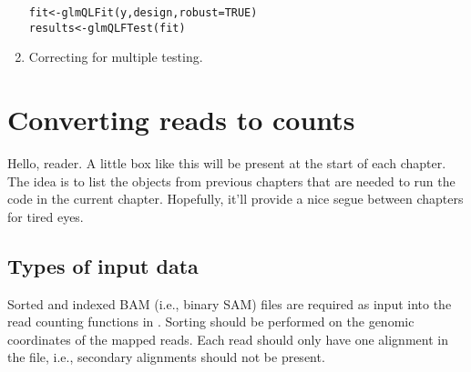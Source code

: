 \documentclass{report}\usepackage[]{graphicx}\usepackage[usenames,dvipsnames]{color}
\newcommand{\hlnum}[1]{\textcolor[rgb]{0.816,0.125,0.439}{#1}}%
\newcommand{\hlopt}[1]{\textcolor[rgb]{0,0,0}{#1}}%
\newcommand{\hlstd}[1]{\textcolor[rgb]{0.251,0.251,0.251}{#1}}%
\newcommand{\hlkwb}[1]{\textcolor[rgb]{0,0,0}{#1}}%
\newcommand{\hlkwc}[1]{\textcolor[rgb]{0.251,0.251,0.251}{#1}}%
\newcommand{\hlkwd}[1]{\textcolor[rgb]{0.878,0.439,0.125}{#1}}%
\newenvironment{knitrout}{}{} %
\newenvironment{combox}
{ \definecolor{shadecolor}{RGB}{255, 240, 240} \begin{shaded}\begin{center}\begin{minipage}[t]{0.95\textwidth} }
{ \end{minipage}\end{center}\end{shaded} \definecolor{shadecolor}{RGB}{240,240,240} }
\begin{document}
\begin{enumerate}
\begin{knitrout}
\begin{kframe}
\begin{alltt}
\hlstd{fit} \hlkwb{<-} \hlkwd{glmQLFit}\hlstd{(y, design,} \hlkwc{robust}\hlstd{=}\hlnum{TRUE}\hlstd{)}
\hlstd{results} \hlkwb{<-} \hlkwd{glmQLFTest}\hlstd{(fit)}
\end{alltt}
\end{kframe}
\end{knitrout}
\item Correcting for multiple testing.
\begin{knitrout}
\color{fgcolor}
\end{knitrout}
\end{enumerate}


\chapter{Converting reads to counts}
\label{chap:count}
\begin{combox}
Hello, reader.
A little box like this will be present at the start of each chapter.
The idea is to list the objects from previous chapters that are needed to run the code in the current chapter.
Hopefully, it'll provide a nice segue between chapters for tired eyes.
\end{combox}

\section{Types of input data}
Sorted and indexed BAM (i.e., binary SAM) files \cite{li2009} are required as input into the read counting functions in . 
Sorting should be performed on the genomic coordinates of the mapped reads.
Each read should only have one alignment in the file, i.e., secondary alignments should not be present.
\end{document}
